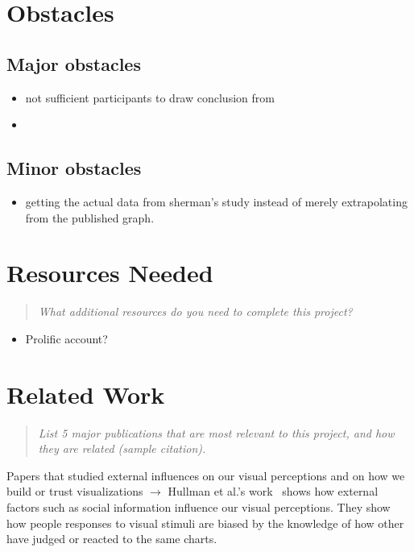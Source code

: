 \documentclass{proc}
\begin{document}
\section{Obstacles}

\subsection{Major obstacles} %
\begin{itemize}
    \item not sufficient participants to draw conclusion from
    \item 
\end{itemize}
\subsection{Minor obstacles}
\begin{itemize}
    \item getting the actual data from sherman's study instead of merely extrapolating from the published graph.
\end{itemize}
\section{Resources Needed}
\begin{quote}
\textit{What additional resources do you need to complete this project?}
\end{quote}
\begin{itemize}
    \item Prolific account?
\end{itemize}

\section{Related Work}
\begin{quote}
\textit{List 5 major publications that are most relevant to this project, and how they are related (sample citation).}
\end{quote}

Papers that studied external influences on our visual perceptions and on how we build or trust visualizations $\rightarrow$
Hullman et al.'s work~\cite{hullman2011impact} shows how external factors such as social information influence our visual perceptions. They show how people responses to visual stimuli are biased by the knowledge of how other have judged or reacted to the same charts. 
\end{document}
